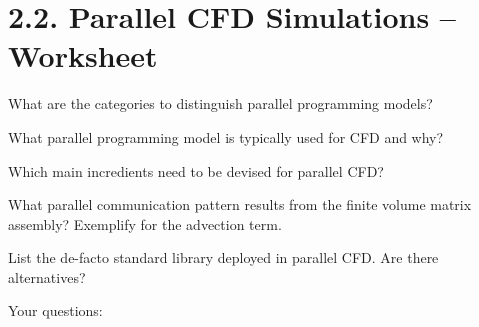 \documentclass{article}
\begin{document}
\section*{2.2. Parallel CFD Simulations -- Worksheet}

\begin{smalltextbox}[fontupper=\bfseries\large]

What are the categories to distinguish parallel programming models?

\end{smalltextbox}


\begin{smalltextbox}[fontupper=\bfseries\large]%

What parallel programming model is typically used for CFD and why?

\end{smalltextbox}


\begin{smalltextbox}[fontupper=\bfseries\large]

Which main incredients need to be devised for parallel CFD?

\end{smalltextbox}


\begin{largetextbox}[fontupper=\bfseries\large]

What parallel communication pattern results from the finite volume matrix assembly? Exemplify for the advection term.

\end{largetextbox}

\pagebreak[4]

\begin{smalltextbox}[fontupper=\bfseries\large]

List the de-facto standard library deployed in parallel CFD. Are there alternatives?

\end{smalltextbox}

\begin{largetextbox}[fontupper=\bfseries\large]

Your questions:

\end{largetextbox}
\end{document}
